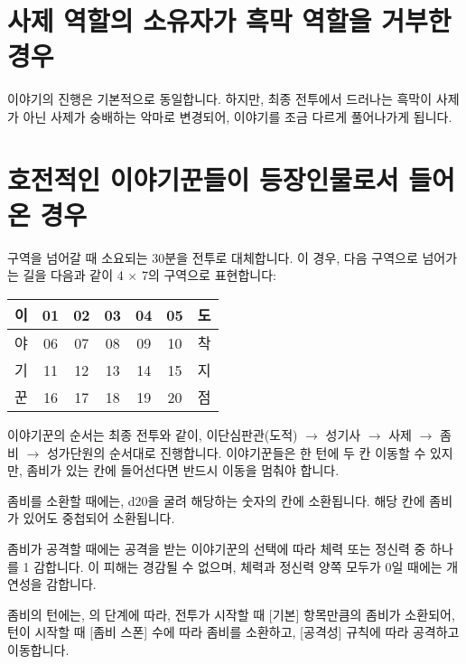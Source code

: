 \documentclass{report}
\begin{document}
	\hypertarget{alternative:no-criminal}{}
	\section{사제 역할의 소유자가 흑막 역할을 거부한 경우}
		이야기의 진행은 기본적으로 동일합니다. 하지만, 최종 전투에서 드러나는 흑막이 사제가 아닌 사제가 숭배하는 악마로 변경되어, 이야기를 조금 다르게 풀어나가게 됩니다.
	
	\hypertarget{alternative:war-ready}{}
	\section{호전적인 이야기꾼들이 등장인물로서 들어온 경우}
		구역을 넘어갈 때 소요되는 30분을 전투로 대체합니다. 이 경우, 다음 구역으로 넘어가는 길을 다음과 같이 4 $\times$ 7의 구역으로 표현합니다:
		
		\begin{center}
			\begin{tabular}{|c|c|c|c|c|c|c|}
				\hline
				이 & 01 & 02 & 03 & 04 & 05 & 도 \\\hline
				야 & 06 & 07 & 08 & 09 & 10 & 착 \\\hline
				기 & 11 & 12 & 13 & 14 & 15 & 지 \\\hline
				꾼 & 16 & 17 & 18 & 19 & 20 & 점 \\\hline
			\end{tabular}
		\end{center}
		
		이야기꾼의 순서는 최종 전투와 같이, 이단심판관(도적) $\rightarrow$ 성기사 $\rightarrow$ 사제 $\rightarrow$ 좀비 $\rightarrow$ 성가단원의 순서대로 진행합니다. 이야기꾼들은 한 턴에 두 칸 이동할 수 있지만, 좀비가 있는 칸에 들어선다면 반드시 이동을 멈춰야 합니다.
		
		좀비를 소환할 때에는, d20을 굴려 해당하는 숫자의 칸에 소환됩니다. 해당 칸에 좀비가 있어도 중첩되어 소환됩니다.
		
		좀비가 공격할 때에는 공격을 받는 이야기꾼의 선택에 따라 체력 또는 정신력 중 하나를 1 감합니다. 이 피해는 경감될 수 없으며, 체력과 정신력 양쪽 모두가 0일 때에는 개연성을 감합니다.
		
		좀비의 턴에는, 의 단계에 따라, 전투가 시작할 때 [기본] 항목만큼의 좀비가 소환되어, 턴이 시작할 때 [좀비 스폰] 수에 따라 좀비를 소환하고, [공격성] 규칙에 따라 공격하고 이동합니다.
		
\end{document}

